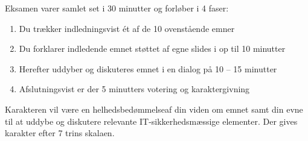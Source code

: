 \documentclass[Screen16to9,17pt]{foils}
\begin{document}

Eksamen varer samlet set i 30 minutter og forløber i 4 faser:

\begin{enumerate}
  \item Du trækker indledningsvist ét af de 10 ovenstående emner
  \item Du forklarer indledende emnet støttet af egne slides i op til 10 minutter
  \item Herefter uddyber og diskuteres emnet i en dialog på 10 -- 15 minutter
  \item Afslutningsvist er der 5 minutters votering og karaktergivning
\end{enumerate}

Karakteren vil være en helhedsbedømmelseaf din viden om emnet samt din evne til at uddybe og diskutere relevante IT-sikkerhedsmæssige elementer. Der gives karakter efter 7 trins skalaen.
\end{document}
